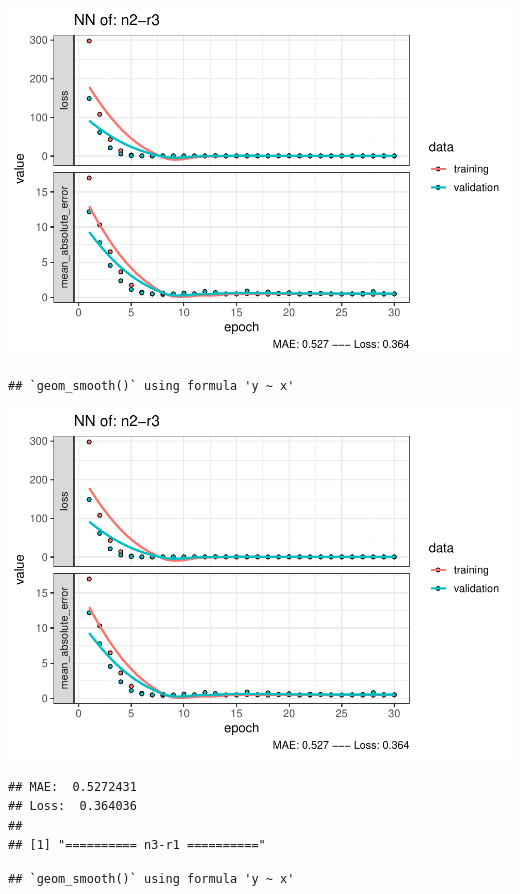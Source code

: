 \documentclass[
]{article}
\begin{document}
\includegraphics{project-code_files/figure-latex/unnamed-chunk-18-21.pdf}

\begin{verbatim}
## `geom_smooth()` using formula 'y ~ x'
\end{verbatim}

\includegraphics{project-code_files/figure-latex/unnamed-chunk-18-22.pdf}

\begin{verbatim}
## MAE:  0.5272431
## Loss:  0.364036 
## 
## [1] "========== n3-r1 =========="
\end{verbatim}

\begin{verbatim}
## `geom_smooth()` using formula 'y ~ x'
\end{verbatim}
\end{document}
